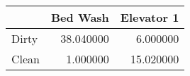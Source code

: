 \begin{tabular}{lrr}
\toprule
 & Bed Wash & Elevator 1 \\
\midrule
Dirty & 38.040000 & 6.000000 \\
Clean & 1.000000 & 15.020000 \\
\bottomrule
\end{tabular}
